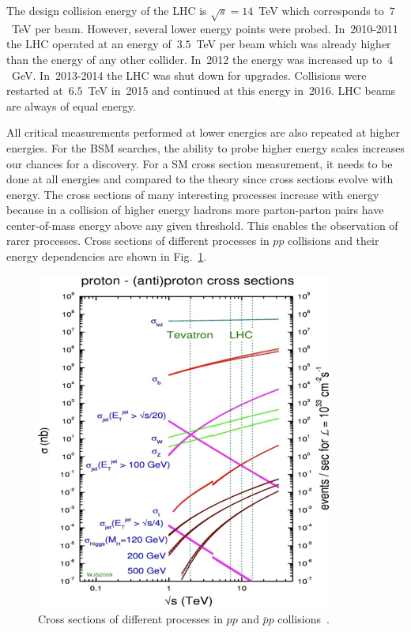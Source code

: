 


The design collision energy of the LHC is $\sqrt{s}=14$~TeV which corresponds to~$7$~TeV per beam. However, several lower energy points were probed. In~2010-2011 the LHC operated at an energy of~$3.5$~TeV per beam which was already higher than the energy of any other collider. In~2012 the energy was increased up to~$4$~GeV. In~2013-2014 the LHC was shut down for upgrades. Collisions were restarted at~$6.5$~TeV in~2015 and continued at this energy in~2016. LHC beams are always of equal energy.

All critical measurements performed at lower energies are also repeated at higher energies. For the BSM searches, the ability to probe higher energy scales increases our chances for a discovery. For a SM cross section measurement, it needs to be done at all energies and compared to the theory since cross sections evolve with energy. The cross sections of many interesting processes increase with energy because in a collision of higher energy hadrons more parton-parton pairs have center-of-mass energy above any given threshold. This enables the observation of rarer processes. Cross sections of different processes in $pp$ collisions and their energy dependencies are shown in Fig.~\ref{fig:LHC_totalCS}.

\begin{figure}
  \centering
  \includegraphics[width=.65\linewidth]{../figs/Exp/LHC_totalCS.png}
  \caption{Cross sections of different processes in $pp$ and $\bar{p}p$ collisions~\cite{ref_fig_LHC_totalCS}.}
  \label{fig:LHC_totalCS}
\end{figure}

